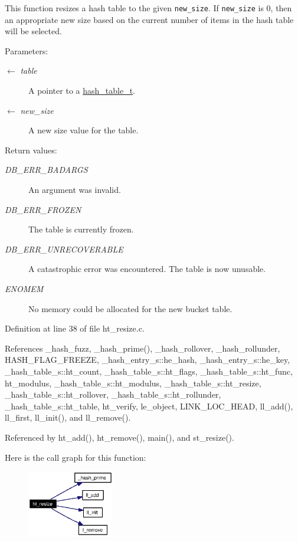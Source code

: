 This function resizes a hash table to the given {\tt new\_\-size}. If {\tt new\_\-size} is 0, then an appropriate new size based on the current number of items in the hash table will be selected.

\begin{Desc}
\item[Parameters:]
\begin{description}
\item[\mbox{$\leftarrow$} {\em table}]A pointer to a \hyperlink{group__dbprim__hash_ga1}{hash\_\-table\_\-t}. \item[\mbox{$\leftarrow$} {\em new\_\-size}]A new size value for the table.\end{description}
\end{Desc}
\begin{Desc}
\item[Return values:]
\begin{description}
\item[{\em DB\_\-ERR\_\-BADARGS}]An argument was invalid. \item[{\em DB\_\-ERR\_\-FROZEN}]The table is currently frozen. \item[{\em DB\_\-ERR\_\-UNRECOVERABLE}]A catastrophic error was encountered. The table is now unusable. \item[{\em ENOMEM}]No memory could be allocated for the new bucket table.\end{description}
\end{Desc}


Definition at line 38 of file ht\_\-resize.c.

References \_\-hash\_\-fuzz, \_\-hash\_\-prime(), \_\-hash\_\-rollover, \_\-hash\_\-rollunder, HASH\_\-FLAG\_\-FREEZE, \_\-hash\_\-entry\_\-s::he\_\-hash, \_\-hash\_\-entry\_\-s::he\_\-key, \_\-hash\_\-table\_\-s::ht\_\-count, \_\-hash\_\-table\_\-s::ht\_\-flags, \_\-hash\_\-table\_\-s::ht\_\-func, ht\_\-modulus, \_\-hash\_\-table\_\-s::ht\_\-modulus, \_\-hash\_\-table\_\-s::ht\_\-resize, \_\-hash\_\-table\_\-s::ht\_\-rollover, \_\-hash\_\-table\_\-s::ht\_\-rollunder, \_\-hash\_\-table\_\-s::ht\_\-table, ht\_\-verify, le\_\-object, LINK\_\-LOC\_\-HEAD, ll\_\-add(), ll\_\-first, ll\_\-init(), and ll\_\-remove().

Referenced by ht\_\-add(), ht\_\-remove(), main(), and st\_\-resize().

Here is the call graph for this function:\begin{figure}[H]
\begin{center}
\leavevmode
\includegraphics[width=107pt]{group__dbprim__hash_ga16_cgraph}
\end{center}
\end{figure}


